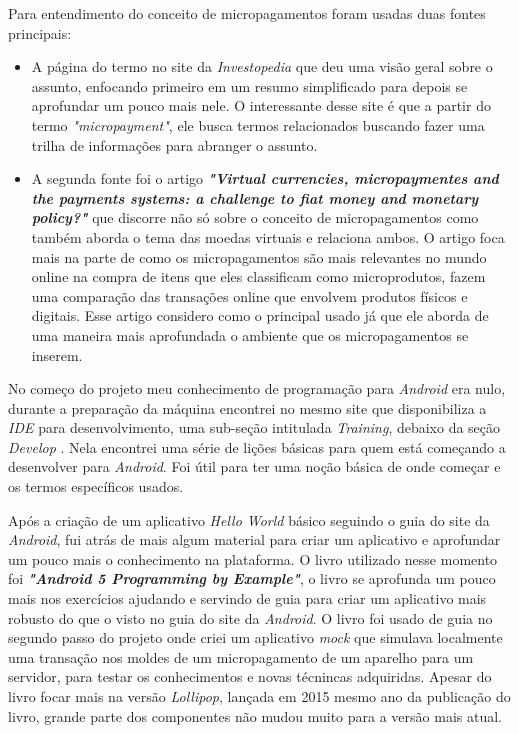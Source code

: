 \documentclass[hidelinks,12pt]{article}
\begin{document}
Para entendimento do conceito de micropagamentos foram usadas duas fontes principais:
\begin{itemize}
\item A p\'agina do termo \cite{invest} no site da \textit{Investopedia} que deu uma vis\~ao geral sobre o assunto, enfocando primeiro em um resumo simplificado para depois se aprofundar um pouco mais nele. O interessante desse site \'e que a partir do termo \textit{"micropayment"}, ele busca termos relacionados buscando fazer uma trilha de informa\c{c}\~oes para abranger o assunto.
\item A segunda fonte foi o artigo \textbf{\textit{"Virtual currencies, micropaymentes and the payments systems: a challenge to fiat money and monetary policy?"}} \cite{microp} que discorre n\~ao s\'o sobre o conceito de micropagamentos como tamb\'em aborda o tema das moedas virtuais e relaciona ambos. O artigo foca mais na parte de como os micropagamentos s\~ao mais relevantes no mundo online na compra de itens que eles classificam como microprodutos, fazem uma compara\c{c}\~ao das transa\c{c}\~oes online que envolvem produtos f\'isicos e digitais. Esse artigo considero como o principal usado j\'a que ele aborda de uma maneira mais aprofundada o ambiente que os micropagamentos se inserem.
\end{itemize}

No come\c{c}o do projeto meu conhecimento de programa\c{c}\~ao para \textit{Android} era nulo, durante a prepara\c{c}\~ao da m\'aquina encontrei no mesmo site que disponibiliza a \textit{IDE} para desenvolvimento, uma sub-se\c{c}\~ao intitulada \textit{Training}, debaixo da se\c{c}\~ao \textit{Develop} \cite{anddev}. Nela encontrei uma s\'erie de li\c{c}\~oes b\'asicas para quem est\'a come\c{c}ando a desenvolver para \textit{Android}. Foi \'util para ter uma no\c{c}\~ao b\'asica de onde come\c{c}ar e os termos espec\'ificos usados.
\newline

Ap\'os a cria\c{c}\~ao de um aplicativo \textit{Hello World} b\'asico seguindo o guia do site da \textit{Android}, fui atr\'as de mais algum material para criar um aplicativo e aprofundar um pouco mais o conhecimento na plataforma. O livro \cite{andppe} utilizado nesse momento foi \textbf{\textit{"Android 5 Programming by Example"}}, o livro \cite{andppe} se aprofunda um pouco mais nos exerc\'icios ajudando e servindo de guia para criar um aplicativo mais robusto do que o visto no guia do site da \textit{Android}. O livro \cite{andppe} foi usado de guia no segundo passo do projeto onde criei um aplicativo \textit{mock} que simulava localmente uma transa\c{c}\~ao nos moldes de um micropagamento de um aparelho para um servidor, para testar os conhecimentos e novas t\'ecnincas adquiridas. Apesar do livro \cite{andppe} focar mais na vers\~ao \textit{Lollipop}, lan\c{c}ada em 2015 mesmo ano da publica\c{c}\~ao do livro, grande parte dos componentes n\~ao mudou muito para a vers\~ao mais atual.
\newline
\end{document}
